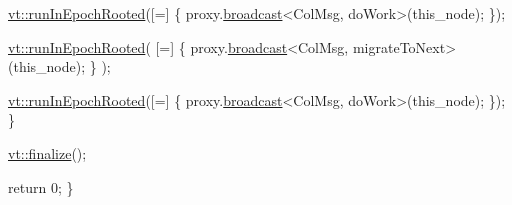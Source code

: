 \begin{DoxyCodeInclude}
    \hyperlink{namespacevt_a9f5cbbc484d7f14f2ad0ee46d62dfb6e}{vt::runInEpochRooted}([=] \{ proxy.\hyperlink{structvt_1_1objgroup_1_1proxy_1_1_proxy_a0b716ca776b1f06e0d7d45afbe9e5274}{broadcast}<ColMsg, doWork>(this\_node); \});

    \hyperlink{namespacevt_a9f5cbbc484d7f14f2ad0ee46d62dfb6e}{vt::runInEpochRooted}(
      [=] \{ proxy.\hyperlink{structvt_1_1objgroup_1_1proxy_1_1_proxy_a0b716ca776b1f06e0d7d45afbe9e5274}{broadcast}<ColMsg, migrateToNext>(this\_node); \}
    );

    \hyperlink{namespacevt_a9f5cbbc484d7f14f2ad0ee46d62dfb6e}{vt::runInEpochRooted}([=] \{ proxy.\hyperlink{structvt_1_1objgroup_1_1proxy_1_1_proxy_a0b716ca776b1f06e0d7d45afbe9e5274}{broadcast}<ColMsg, doWork>(this\_node); \});
  \}

  \hyperlink{namespacevt_a540d90dbd6e97b69f1dcbc9ee9314cff}{vt::finalize}();

  \textcolor{keywordflow}{return} 0;
\}
\end{DoxyCodeInclude}
